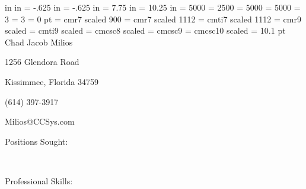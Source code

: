  in
 in
\hoffset = -.625 in%
\voffset = -.625 in%
\hsize = 7.75 in%
\vsize = 10.25 in%
\nopagenumbers%
\tolerance = 5000%
\hbadness = 2500%
\hyphenpenalty = 5000%
\exhyphenpenalty = 5000%
\lefthyphenmin = 3%
\righthyphenmin = 3%
\parindent = 0 pt%
\font\myfp = cmr7 scaled 900%
\font\myrm = cmr7 scaled 1112%
\font\myit = cmti7 scaled 1112%
\font\mybigrm = cmr9 scaled \magstephalf%
\font\mybigit = cmti9 scaled \magstephalf%
\font\mylilcsc = cmcsc8 scaled \magstephalf%
\font\mycsc = cmcsc9%
\font\mybigcsc = cmcsc10 scaled %
\baselineskip = 10.1 pt
{%
	\mybigcsc%
	\hfil%
	Chad Jacob Milios%
	\hfil%
}%
\smallskip%
{%
	\mycsc%
	\hfil%
	1256 Glendora Road%
	\hfil%
	\par%
	\hfil%
	Kissimmee, Florida 34759%
	\hfil%
	\par%
	\hfil%
	(614) 397-3917%
	\hfil%
	\par%
	\hfil%
	Milios@CCSys.com%
	\hfil%
}%
\bigskip%
{%
	\mycsc%
	Positions Sought:%
	\hfil%
	\par%
}%
\medskip%
\hbox{%
	\vtop{%
		\hsize = .125 in%
		\hfil%
	}%
}%
\bigskip%
{%
	\mycsc%
	Professional Skills:%
	\hfil%
	\par%
}%
\medskip%
